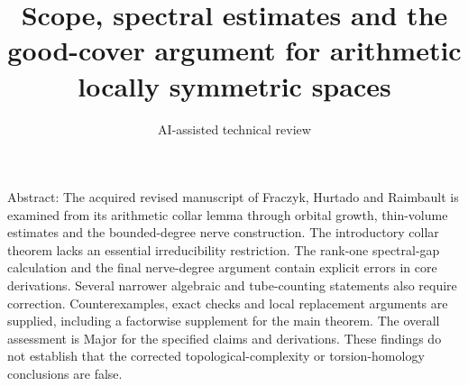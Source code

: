\documentclass[10pt]{article}
\title{Scope, spectral estimates and the good-cover argument for arithmetic locally symmetric spaces}
\author{AI-assisted technical review}
\date{}
\begin{document}
\maketitle
Abstract: The acquired revised manuscript of Fraczyk, Hurtado and Raimbault is examined from its arithmetic collar lemma through orbital growth, thin-volume estimates and the bounded-degree nerve construction. The introductory collar theorem lacks an essential irreducibility restriction. The rank-one spectral-gap calculation and the final nerve-degree argument contain explicit errors in core derivations. Several narrower algebraic and tube-counting statements also require correction. Counterexamples, exact checks and local replacement arguments are supplied, including a factorwise supplement for the main theorem. The overall assessment is Major for the specified claims and derivations. These findings do not establish that the corrected topological-complexity or torsion-homology conclusions are false.\par
\end{document}
